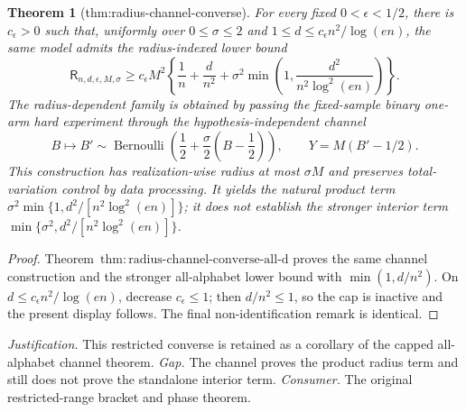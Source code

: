 \documentclass{article}
\newtheorem{theorem}{Theorem}
\begin{document}
\begin{theorem}[thm:radius-channel-converse]\label{thm:radius-channel-converse}
For every fixed \(0<\epsilon<1/2\), there is \(c_{\epsilon}>0\) such that, uniformly over \(0\le\sigma\le2\) and \(1\le d\le c_{\epsilon}n^2/\log(en)\), the same model admits the radius-indexed lower bound
\[
 \mathsf R_{n,d,\epsilon,M,\sigma}
 \ge c_{\epsilon}M^2\left\{
 \frac1n+\frac d{n^2}+\sigma^2\min\left(1,\frac{d^2}{n^2\log^2(en)}\right)
 \right\}.
\]
The radius-dependent family is obtained by passing the fixed-sample binary one-arm hard experiment through the hypothesis-independent channel
\[
 B\longmapsto B'\sim\operatorname{Bernoulli}\!\left(\frac12+\frac\sigma2\left(B-\frac12\right)\right),
 \qquad Y=M(B'-1/2).
\]
This construction has realization-wise radius at most \(\sigma M\) and preserves total-variation control by data processing.  It yields the natural product term \(\sigma^2\min\{1,d^2/[n^2\log^2(en)]\}\); it does not establish the stronger interior term \(\min\{\sigma^2,d^2/[n^2\log^2(en)]\}\).
\end{theorem}
\begin{proof}
Theorem~\(\mathrm{thm:radius\text{-}channel\text{-}converse\text{-}all\text{-}d}\) proves the same channel construction and the stronger all-alphabet lower bound with \(\min(1,d/n^2)\).  On \(d\le c_{\epsilon}n^2/\log(en)\), decrease \(c_{\epsilon}\le1\); then \(d/n^2\le1\), so the cap is inactive and the present display follows.  The final non-identification remark is identical.
\end{proof}
\par\smallskip\noindent \textit{Justification.} This restricted converse is retained as a corollary of the capped all-alphabet channel theorem. \textit{Gap.} The channel proves the product radius term and still does not prove the standalone interior term. \textit{Consumer.} The original restricted-range bracket and phase theorem.
\end{document}
